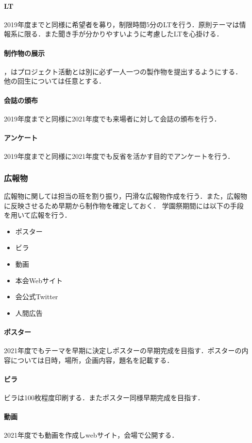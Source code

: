 \paragraph{LT}
2019年度までと同様に希望者を募り，制限時間5分のLTを行う．原則テーマは情報系に限る．また聞き手が分かりやすいように考慮したLTを心掛ける．
\paragraph{制作物の展示}
\secondGrade{}，\thirdGrade{}はプロジェクト活動とは別に必ず一人一つの製作物を提出するようにする．他の回生については任意とする．
\paragraph{会誌の頒布}
2019年度までと同様に2021年度でも来場者に対して会誌の頒布を行う．
\paragraph{アンケート}
2019年度までと同様に2021年度でも反省を活かす目的でアンケートを行う．
\subsubsection*{広報物}
広報物に関しては担当の班を割り振り，円滑な広報物作成を行う．また，広報物に反映させるため早期から制作物を確定しておく．
学園祭期間には以下の手段を用いて広報を行う．
\begin{itemize}
    \item ポスター
    \item ビラ
    \item 動画
    \item 本会Webサイト
    \item 会公式Twitter
    \item 人間広告
\end{itemize}
\paragraph{ポスター}
2021年度でもテーマを早期に決定しポスターの早期完成を目指す．ポスターの内容については日時，場所，企画内容，題名を記載する．
\paragraph{ビラ}
ビラは100枚程度印刷する．またポスター同様早期完成を目指す．
\paragraph{動画}
2021年度でも動画を作成しwebサイト，会場で公開する．
